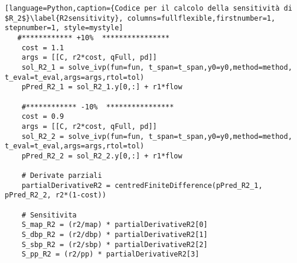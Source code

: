 \begin{lstlisting}[language=Python,caption={Codice per il calcolo della sensitività di $R_2$}\label{R2sensitivity}, columns=fullflexible,firstnumber=1, stepnumber=1, style=mystyle]
   #************ +10%  ****************
    cost = 1.1
    args = [[C, r2*cost, qFull, pd]]
    sol_R2_1 = solve_ivp(fun=fun, t_span=t_span,y0=y0,method=method, t_eval=t_eval,args=args,rtol=tol)
    pPred_R2_1 = sol_R2_1.y[0,:] + r1*flow
    
    #************ -10%  ****************
    cost = 0.9
    args = [[C, r2*cost, qFull, pd]]
    sol_R2_2 = solve_ivp(fun=fun, t_span=t_span,y0=y0,method=method, t_eval=t_eval,args=args,rtol=tol)
    pPred_R2_2 = sol_R2_2.y[0,:] + r1*flow
    
    # Derivate parziali
    partialDerivativeR2 = centredFiniteDifference(pPred_R2_1, pPred_R2_2, r2*(1-cost))
    
    # Sensitivita
    S_map_R2 = (r2/map) * partialDerivativeR2[0]
    S_dbp_R2 = (r2/dbp) * partialDerivativeR2[1]
    S_sbp_R2 = (r2/sbp) * partialDerivativeR2[2]
    S_pp_R2 = (r2/pp) * partialDerivativeR2[3]
\end{lstlisting}